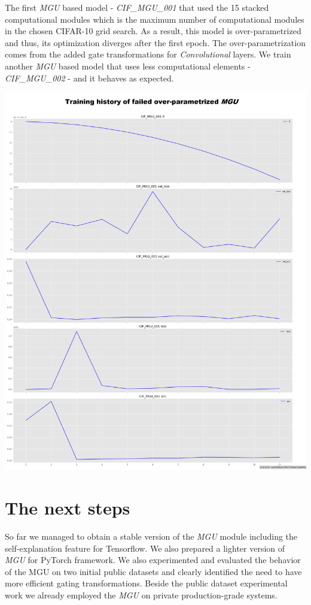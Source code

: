 \documentclass[11pt]{article}
\begin{document}
The first \emph{MGU} based model - \emph{CIF\_MGU\_001} that used the 15
stacked computational modules which is the maximum number of
computational modules in the chosen CIFAR-10 grid search. As a result,
this model is over-parametrized and thus, its optimization diverges
after the first epoch. The over-parametrization comes from the added
gate transformations for \emph{Convolutional} layers. We train another
\emph{MGU} based model that uses less computational elements -
\emph{CIF\_MGU\_002} - and it behaves as expected.

\includegraphics{img_cifar10_mgu_fail.png}

    \hypertarget{the-next-steps}{%
\section{The next steps}\label{the-next-steps}}

So far we managed to obtain a stable version of the \emph{MGU} module
including the self-explanation feature for Tensorflow. We also prepared
a lighter version of \emph{MGU} for PyTorch framework. We also
experimented and evaluated the behavior of the MGU on two initial public
datasets and clearly identified the need to have more efficient gating
transformations. Beside the public dataset experimental work we already
employed the \emph{MGU} on private production-grade systems.
\end{document}
